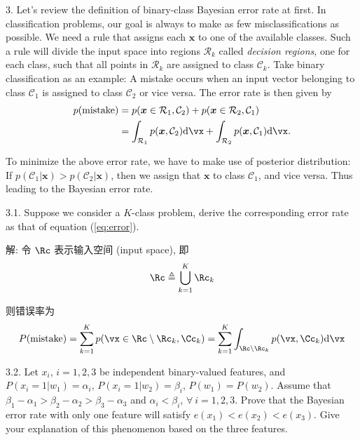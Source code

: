 \documentclass[openany]{ctexbook}
\theoremstyle{kaiti}
\theoremstyle{normal}
\begin{document}
3. Let's review the definition of binary-class Bayesian error rate at first. In classification problems, our goal is always to make as few misclassifications as possible. We need a rule that assigns each $\bm{x}$ to one of the available classes. Such a rule will divide the input space into regions $\mathcal{R}_{k}$ called \emph{decision regions}, one for each class, such that all points in $\mathcal{R}_{k}$ are assigned to class $\mathcal{C}_{k}$. Take binary classification as an example: A mistake occurs when an input vector belonging to class $\mathcal{C}_{1}$ is assigned to class $\mathcal{C}_{2}$ or vice versa. The error rate is then given by
\begin{equation}
  \begin{aligned}
    p(\text{mistake})
    &=p(\bm{x}\in \mathcal{R}_{1}, \mathcal{C}_{2})+p(\bm{x}\in \mathcal{R}_{2}, \mathcal{C}_{1})\\
    &=\int_{\mathcal{R}_{1}}p(\bm{x},\mathcal{C}_{2})\mathrm{d}\vx+\int_{\mathcal{R}_{2}}p(\bm{x},\mathcal{C}_{1})\mathrm{d}\vx.\\
  \end{aligned}
  \label{eq:error}
\end{equation}

To minimize the above error rate, we have to make use of posterior distribution: If $p(\mathcal{C}_{1}|\bm{x})>p(\mathcal{C}_{2}|\bm{x})$, then we assign that $\bm{x}$ to class $\mathcal{C}_{1}$, and vice versa. Thus leading to the Bayesian error rate.

3.1. Suppose we consider a $K$-class problem, derive the corresponding error rate as that of equation (\ref{eq:error}).

解: 令 $\Rc$ 表示输入空间 (input space), 即
\begin{equation}
  \Rc\triangleq\bigcup_{k=1}^K\Rc_k
\end{equation}

则错误率为
\begin{equation}
  P(\text{mistake})=\sum_{k=1}^Kp(\vx\in\Rc\setminus\Rc_k,\Cc_k)=\sum_{k=1}^K\int_{\Rc\setminus\Rc_k}p(\vx,\Cc_k)\mathrm{d}\vx
\end{equation}

3.2. Let $x_{i}$, $i=1, 2, 3$ be independent binary-valued features, and $P(x_{i}=1|w_{1})=\alpha_{i}$, $P(x_{i}=1|w_{2})=\beta_{i}$, $P(w_{1})=P(w_{2})$. Assume that $\beta_{1}-\alpha_{1}>\beta_{2}-\alpha_{2}>\beta_{3}-\alpha_{3}$ and $\alpha_{i}<\beta_{i}$, $\forall~i=1, 2, 3$. Prove that the Bayesian error rate with only one feature will satisfy $e(x_{1})<e(x_{2})<e(x_{3})$. Give your explanation of this phenomenon based on the three features.
\end{document}
